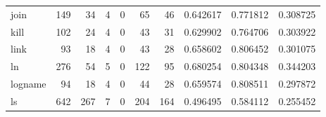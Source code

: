 \begin{longtable}{lrrrrrrrrr}
join      &                                                149 &                                                 34 &                                                  4 &                                                  0 &                                                 65 &                                                 46 &                                           0.642617 &                               0.771812 &                             0.308725 \\
kill      &                                                102 &                                                 24 &                                                  4 &                                                  0 &                                                 43 &                                                 31 &                                           0.629902 &                               0.764706 &                             0.303922 \\
link      &                                                 93 &                                                 18 &                                                  4 &                                                  0 &                                                 43 &                                                 28 &                                           0.658602 &                               0.806452 &                             0.301075 \\
ln        &                                                276 &                                                 54 &                                                  5 &                                                  0 &                                                122 &                                                 95 &                                           0.680254 &                               0.804348 &                             0.344203 \\
logname   &                                                 94 &                                                 18 &                                                  4 &                                                  0 &                                                 44 &                                                 28 &                                           0.659574 &                               0.808511 &                             0.297872 \\
ls        &                                                642 &                                                267 &                                                  7 &                                                  0 &                                                204 &                                                164 &                                           0.496495 &                               0.584112 &                             0.255452 \\

\end{longtable}
